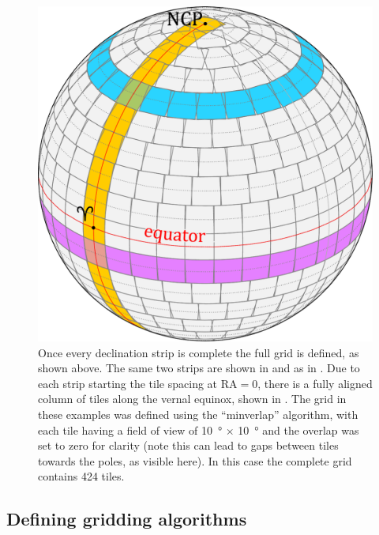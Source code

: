 \begin{colsection}
\begin{colsection}
\begin{figure}[p]
    \begin{center}
        \includegraphics[width=\linewidth]{images/globe4.pdf}
    \end{center}
    \caption[A fully tiled sphere]{
        Once every declination strip is complete the full grid is defined, as shown above. The same two strips are shown in  and  as in . Due to each strip starting the tile spacing at RA$=0$, there is a fully aligned column of tiles along the vernal equinox, shown in . The grid in these examples was defined using the ``minverlap'' algorithm, with each tile having a field of view of \SI{10}{\degree} $\times$ \SI{10}{\degree} and the overlap was set to zero for clarity (note this can lead to gaps between tiles towards the poles, as visible here). In this case the complete grid contains 424 tiles.
    }\label{fig:tiledsphere}
\end{figure}

\newpage

\end{colsection}


\subsection{Defining gridding algorithms}
\label{sec:algorithms}
\begin{colsection}


\end{colsection}
\end{colsection}
